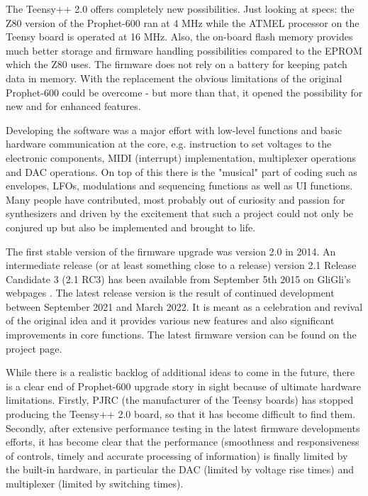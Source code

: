 \documentclass[landscape, 11pt, oneside, twoside]{report}
\newenvironment{flowtext}{\addmargin[0cm]{0cm}}{\endaddmargin} %
\begin{document}
\begin{flowtext}
The Teensy++ 2.0 offers completely new possibilities. Just looking at specs: the Z80 version of the Prophet-600 ran at 4 MHz while the ATMEL processor on the Teensy board is operated at 16 MHz. Also, the on-board flash memory provides much better storage and firmware handling possibilities compared to the EPROM which the Z80 uses. The firmware does not rely on a battery for keeping patch data in memory. With the replacement the obvious limitations of the original Prophet-600 could be overcome - but more than that, it opened the possibility for new and for enhanced features. 

Developing the software was a major effort with low-level functions and basic hardware communication at the core, e.g. instruction to set voltages to the electronic components, MIDI (interrupt) implementation, multiplexer operations and DAC operations. On top of this there is the "musical" part of coding such as envelopes, LFOs, modulations and sequencing functions as well as UI functions. Many people have contributed, most probably out of curiosity and passion for synthesizers and driven by the excitement that such a project could not only be conjured up but also be implemented and brought to life. 

The first stable version of the firmware upgrade was version 2.0 in 2014. An intermediate release (or at least something close to a release) version 2.1 Release Candidate 3 (2.1 RC3) has been available from September 5th 2015 on GliGli's webpages \cite{gligli}. The latest release version \version is the result of continued development between September 2021 and March 2022. It is meant as a celebration and revival of the original idea and it provides various new features and also significant improvements in core functions. The latest firmware version can be found on the project page\cite{newversion}.

While there is a realistic backlog of additional ideas to come in the future, there is a clear end of Prophet-600 upgrade story in sight because of ultimate hardware limitations. Firstly, PJRC (the manufacturer of the Teensy boards) has stopped producing the Teensy++ 2.0 board, so that it has become difficult to find them. Secondly, after extensive performance testing in the latest firmware developments efforts, it has become clear that the performance (smoothness and responsiveness of controls, timely and accurate processing of information) is finally limited by the built-in hardware, in particular the DAC (limited by voltage rise times) and multiplexer (limited by switching times). 


\end{flowtext}
\end{document}
